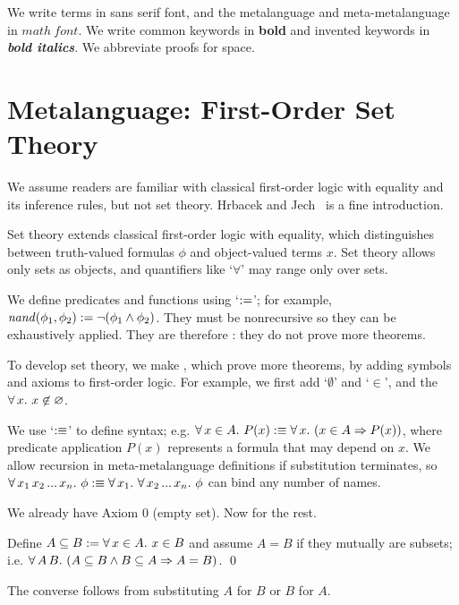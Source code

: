 We write \ftargetlang terms in \textsf{sans serif} font, and the metalanguage and meta-metalanguage in $\mathit{math\ font}$. We write common keywords in \textbf{bold} and invented keywords in \textbf{\textit{bold italics}}. We abbreviate proofs for space.


\section{Metalanguage: First-Order Set Theory}
\label{sec:metalanguage}

We assume readers are familiar with classical first-order logic with equality and its inference rules, but not set theory. Hrbacek and Jech~\cite{cit:hrbacek-1999-set-theory} is a fine introduction.

Set theory extends classical first-order logic with equality, which distinguishes between truth-valued formulas $\phi$ and object-valued terms $x$. Set theory allows only sets as objects, and quantifiers like `$\forall$' may range only over sets.

We define predicates and functions using `$:=$'; for example, $\mathit{nand}(\phi_1,\phi_2) := \neg (\phi_1 \wedge \phi_2)$. They must be nonrecursive so they can be exhaustively applied. They are therefore : they do not prove more theorems.

To develop set theory, we make , which prove more theorems, by adding symbols and axioms to first-order logic. For example, we first add `$\emptyset$' and `$\in$', and the  $\forall\,{x}\ldotp\,{x \not\in \varnothing}$.

We use `$:\equiv$' to define syntax; e.g. $\forall\,{x \in A}\ldotp\,{P(x)} :\equiv \forall\,{x}\ldotp\,{(x \in A \Rightarrow P(x))}$, where predicate application $P(x)$ represents a formula that may depend on $x$. We allow recursion in meta-metalanguage definitions if substitution terminates, so $\forall\,{x_1\,x_2\,...\,x_n}\ldotp\, \phi :\equiv \forall\,{x_1}\ldotp\, \forall\,{x_2\,...\,x_n}\ldotp\, \phi$ can bind any number of names.

We already have Axiom 0 (empty set). Now for the rest.
\begin{axiom}[extensionality] Define $A \subseteq B := \forall\,{x \in A}\ldotp\,{x \in B}$ and assume $A = B$ if they mutually are subsets; i.e.
$\forall\,{A\,B}\ldotp\,{(A \subseteq B \wedge B \subseteq A \Rightarrow A = B)}$.
\qed
\end{axiom}
The converse follows from substituting $A$ for $B$ or $B$ for $A$.

